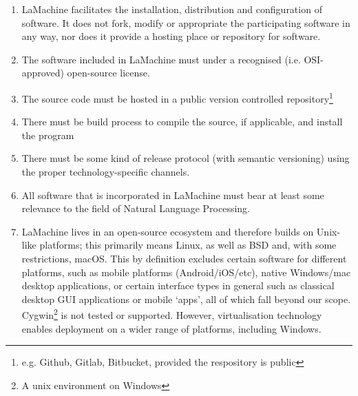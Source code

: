 \documentclass[a4paper,11pt]{article}
\begin{document}
\begin{enumerate}
    \item LaMachine facilitates the installation, distribution and configuration of software. It does not fork, modify
        or appropriate the participating software in any way, nor does it provide a hosting place or repository for
        software.
    \item The software included in LaMachine must under a recognised (i.e. OSI-approved) open-source license.
    \item The source
        code must be hosted in a public version controlled repository\footnote{e.g. Github, Gitlab, Bitbucket, provided
        the respository is public}
    \item There must be build process to compile the source, if applicable, and install the program
    \item There must be some kind of release protocol (with semantic versioning) using the proper
technology-specific channels.
    \item All software that is incorporated in LaMachine must bear at least some relevance to the field of Natural Language Processing.
    \item LaMachine lives in an open-source ecosystem and therefore builds on Unix-like platforms; this primarily
        means Linux, as well as BSD and, with some restrictions, macOS. This by definition excludes certain software for different platforms, such as
        mobile platforms (Android/iOS/etc), native Windows/mac desktop applications, or certain interface types in
        general such as classical desktop GUI applications or mobile `apps', all of which fall beyond our scope.
        Cygwin\footnote{A unix environment on Windows} is not tested or
        supported.  However, virtualisation technology enables deployment on a wider range of platforms, including Windows.
\end{enumerate}
\end{document}
